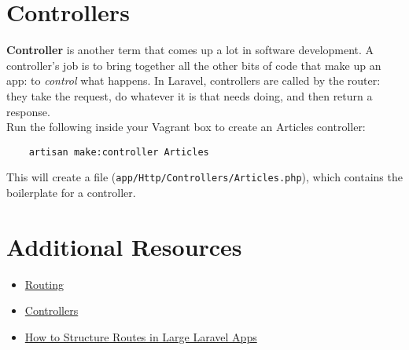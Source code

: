 \section{Controllers}

\textbf{Controller} is another term that comes up a lot in software development. A controller's job is to bring together all the other bits of code that make up an app: to \textit{control} what happens. In Laravel, controllers are called by the router: they take the request, do whatever it is that needs doing, and then return a response.
\\

Run the following inside your Vagrant box to create an Articles controller:

\begin{verbatim}
    artisan make:controller Articles
\end{verbatim}

This will create a file (\texttt{app/Http/Controllers/Articles.php}), which contains the boilerplate for a controller.



\section{Additional Resources}

\begin{itemize}[leftmargin=*]
    \item \href{https://laravel.com/docs/master/routing}{Routing}
    \item \href{http://laravel.com/docs/master/controllers}{Controllers}
    \item \href{https://laraveldaily.com/how-to-structure-routes-in-large-laravel-projects/}{How to Structure Routes in Large Laravel Apps}
\end{itemize}
